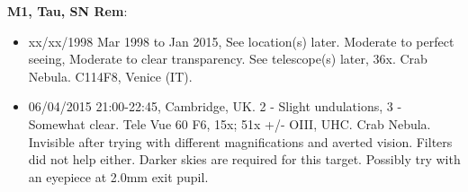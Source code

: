 {\bf M1, Tau, SN Rem}:
\begin{itemize}
\item xx/xx/1998 Mar 1998 to Jan 2015, See location(s) later. Moderate to perfect seeing, Moderate to clear transparency. See telescope(s) later, 36x. Crab Nebula. C114F8, Venice (IT).
\item 06/04/2015 21:00-22:45, Cambridge, UK. 2 - Slight undulations, 3 - Somewhat clear. Tele Vue 60 F6, 15x; 51x +/- OIII, UHC. Crab Nebula. Invisible after trying with different magnifications and averted vision. Filters did not help either. Darker skies are required for this target. Possibly try with an eyepiece at 2.0mm exit pupil.
\end{itemize}
